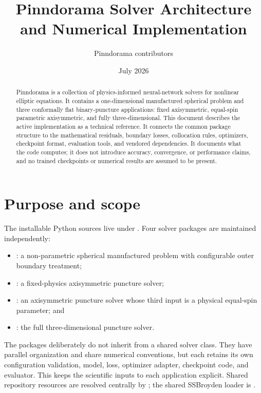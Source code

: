 \documentclass[11pt]{article}
\title{Pinndorama Solver Architecture and Numerical Implementation}
\author{Pinndorama contributors}
\date{July 2026}
\begin{document}
\maketitle

\begin{abstract}
Pinndorama is a collection of physics-informed neural-network solvers for
nonlinear elliptic equations.  It contains a one-dimensional manufactured
spherical problem and three conformally flat binary-puncture applications:
fixed axisymmetric, equal-spin parametric axisymmetric, and fully
three-dimensional.  This document describes the active implementation as a
technical reference.  It connects the common package structure to the
mathematical residuals, boundary losses, collocation rules, optimizers,
checkpoint format, evaluation tools, and vendored dependencies.  It documents
what the code computes; it does not introduce accuracy, convergence, or
performance claims, and no trained checkpoints or numerical results are
assumed to be present.
\end{abstract}

\tableofcontents

\section{Purpose and scope}

The installable Python sources live under
.  Four solver packages are maintained independently:

\begin{itemize}[nosep]
  \item {}: a non-parametric spherical manufactured
        problem with configurable outer boundary treatment;
  \item {}: a fixed-physics axisymmetric puncture
        solver;
  \item {}: an axisymmetric puncture solver
        whose third input is a physical equal-spin parameter; and
  \item {}: the full three-dimensional puncture
        solver.
\end{itemize}

The packages deliberately do not inherit from a shared solver class.  They
have parallel organization and share numerical conventions, but each retains
its own configuration validation, model, loss, optimizer adapter, checkpoint
code, and evaluator.  This keeps the scientific inputs to each application
explicit.  Shared repository resources are resolved centrally by
; the shared SSBroyden loader is
.
\end{document}
